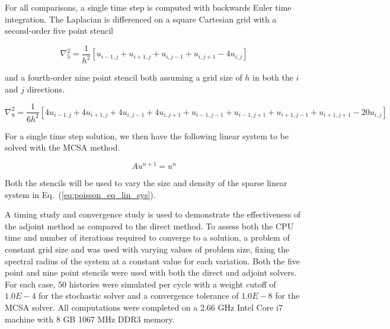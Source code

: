 \documentclass[preprint,12pt]{elsarticle}
\begin{document}
For all comparisons, a single time step is computed with backwards
Euler time integration. The Laplacian is differenced on a square
Cartesian grid with a second-order five point stencil

\begin{equation}
  \nabla^2_5 = \frac{1}{h^2}[u_{i-1,j} + u_{i+1,j} + u_{i,j-1} +
    u_{i,j+1} - 4 u_{i,j}]
  \label{eq:five_point_stencil}
\end{equation}

and a fourth-order nine point stencil both assuming a grid size of $h$
in both the $i$ and $j$ directions.

\begin{equation}
  \nabla^2_9 = \frac{1}{6h^2}[4 u_{i-1,j} + 4 u_{i+1,j} + 4 u_{i,j-1}
    + 4 u_{i,j+1} + u_{i-1,j-1} + u_{i-1,j+1} + u_{i+1,j-1} +
    u_{i+1,j+1} - 20 u_{i,j}]
  \label{eq:nine_point_stencil}
\end{equation}

For a single time step solution, we then have the following linear
system to be solved with the MCSA method.

\begin{equation}
  A u^{n+1} = u^n
  \label{eq:poisson_eq_lin_sys}
\end{equation}

Both the stencils will be used to vary the size and density of the
sparse linear system in Eq.~(\ref{eq:poisson_eq_lin_sys}).

A timing study and convergence study is used to demonstrate the
effectiveness of the adjoint method as compared to the direct
method. To assess both the CPU time and number of iterations required
to converge to a solution, a problem of constant grid size and was
used with varying values of problem size, fixing the spectral radius
of the system at a constant value for each variation. Both the five
point and nine point stencils were used with both the direct and
adjoint solvers. For each case, 50 histories were simulated per cycle
with a weight cutoff of $1.0E-4$ for the stochastic solver and a
convergence tolerance of $1.0E-8$ for the MCSA solver. All
computations were completed on a 2.66 GHz Intel Core i7 machine with 8
GB 1067 MHz DDR3 memory.
\end{document}
